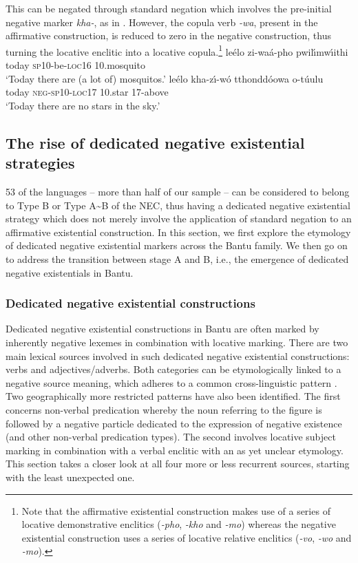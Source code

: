 \documentclass[output=paper]{langsci/langscibook}
\begin{document}
This can be negated through standard negation which
involves the pre-initial negative marker \textit{kha-}, as in
. However, the copula verb \textit{-wa}, present in the
affirmative construction, is reduced to zero in the negative construction,
thus turning the locative enclitic into a locative copula.\footnote{Note
that the affirmative existential construction makes use of a series of
locative demonstrative enclitics (\textit{-pho}, \textit{-kho} and
\textit{-mo}) whereas the negative existential construction uses a series
of locative relative enclitics (\textit{-vo}, \textit{-wo} and
\textit{-mo}).} \ea\label{ex:shangaji-mosquito-star}
\ea\label{ex:shangaji-mosquito} \gll le{\'e}lo zi-wa{\'a}-pho
pwil{\'\i}mw{\'\i}ithi\\ today \textsc{sp}10-be-\textsc{loc}16
10.mosquito\\ \glt `Today there are (a lot of) mosquitos.'
\ex\label{ex:shangaji-star} \gll le{\'e}lo kha-z{\'\i}-w{\'o}
tthondd{\'o}owa o-t{\'u}ulu\\ today \textsc{neg-sp10-loc17} 10.star
17-above\\ \glt `Today there are no stars in the sky.' \z\z

\subsection{The rise of dedicated negative existential
strategies}\label{sec:1:5.2} 53 of the languages -- more than half of our
sample -- can be considered to belong to Type B or Type A{\textasciitilde}B
of the NEC, thus having a dedicated negative existential strategy which
does not merely involve the application of standard negation to an
affirmative existential construction. In this section, we first explore the
etymology of dedicated negative existential markers across the Bantu
family. We then go on to address the transition between stage A and B,
i.e., the emergence of dedicated negative existentials in Bantu. 

\subsubsection{Dedicated negative existential
constructions}\label{sec:1:5.2.1} Dedicated negative existential
constructions in Bantu are often marked by inherently negative lexemes in
combination with locative marking. There are two main lexical sources
involved in such dedicated negative existential constructions: verbs and
adjectives\slash adverbs. Both categories can be etymologically linked to a
negative source meaning, which adheres to a common cross-linguistic pattern
\citep{Veselinova2013}. Two geographically more restricted patterns have
also been identified. The first concerns non-verbal predication whereby
the noun referring to the figure is followed by a negative particle
dedicated to the expression of negative existence (and other non-verbal
predication types). The second involves locative subject marking in
combination with a verbal enclitic with an as yet unclear etymology. This
section takes a closer look at all four more or less recurrent sources, starting with the least
unexpected one.
\end{document}
